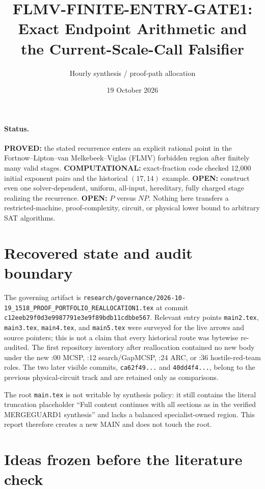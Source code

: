\documentclass[11pt]{article}
\title{FLMV-FINITE-ENTRY-GATE1: Exact Endpoint Arithmetic and the Current-Scale-Call Falsifier}
\author{Hourly synthesis / proof-path allocation}
\date{19 October 2026}
\begin{document}
\maketitle

\paragraph{Status.}
\textbf{PROVED:} the stated recurrence enters an explicit rational point in the
Fortnow--Lipton--van Melkebeek--Viglas (FLMV) forbidden region after finitely
many valid stages.  \textbf{COMPUTATIONAL:} exact-fraction code checked 12,000
initial exponent pairs and the historical $(17,14)$ example.  \textbf{OPEN:}
construct even one solver-dependent, uniform, all-input, hereditary, fully
charged stage realizing the recurrence.  \textbf{OPEN:} $P$ versus $NP$.
Nothing here transfers a restricted-machine, proof-complexity, circuit, or
physical lower bound to arbitrary SAT algorithms.

\section{Recovered state and audit boundary}

The governing artifact is
\texttt{research/governance/2026-10-19\_1518\_PROOF\_PORTFOLIO\_REALLOCATION1.tex}
at commit \texttt{c12eeb29f0d3e9987791e3e9f89bdb11cdbbe567}.  Relevant
entry points \texttt{main2.tex}, \texttt{main3.tex}, \texttt{main4.tex}, and
\texttt{main5.tex} were surveyed for the live arrows and source pointers; this
is not a claim that every historical route was bytewise re-audited.  The first
repository inventory after reallocation contained no new body under the new
:00 MCSP, :12 search/GapMCSP, :24 ARC, or :36 hostile-red-team roles.  The two
later visible commits, \texttt{ca62f49...} and \texttt{40dd4f4...}, belong to
the previous physical-circuit track and are retained only as comparisons.

The root \texttt{main.tex} is not writable by synthesis policy: it still
contains the literal truncation placeholder ``Full content continues with all
sections as in the verified MERGEGUARD1 synthesis'' and lacks a balanced
specialist-owned region.  This report therefore creates a new MAIN and does
not touch the root.

\section{Ideas frozen before the literature check}
\end{document}
